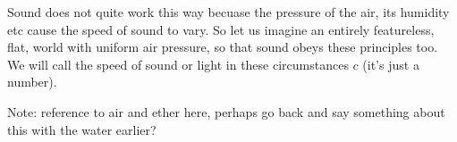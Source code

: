 \documentclass[a4paper]{report}
\begin{document}
Sound does not quite work this way becuase the pressure of the air, its humidity etc cause the speed of sound to vary. So let us imagine an entirely featureless, flat, world with uniform air pressure, so that sound obeys these principles too. We will call the speed of sound or light in these circumstances $c$ (it's just a number).

Note: reference to air and ether here, perhaps go back and say something about this with the water earlier?
\end{document}
